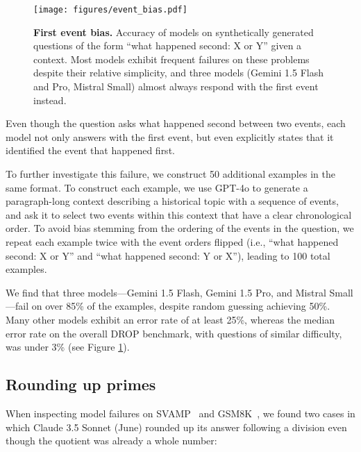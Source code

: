 \begin{figure}
    \centering
    \texttt{[image: figures/event\_bias.pdf]}
    \caption{\textbf{First event bias.} Accuracy of models on synthetically generated questions of the form  ``what happened second: X or Y'' given a context. Most models exhibit frequent failures on these problems despite their relative simplicity, and three models (Gemini 1.5 Flash and Pro, Mistral Small) almost always respond with the first event instead.}
    \label{appfig:event_bias}
\end{figure}

\noindent Even though the question asks what happened second between two events, each model not only answers with the first event, but even explicitly states that it identified the event that happened first.

To further investigate this failure, we construct 50 additional examples in the same format. To construct each example, we use GPT-4o to generate a paragraph-long context describing a historical topic with a sequence of events, and ask it to select two events within this context that have a clear chronological order. To avoid bias stemming from the ordering of the events in the question, we repeat each example twice with the event orders flipped (i.e., ``what happened second: X or Y'' and ``what happened second: Y or X''), leading to 100 total examples.

We find that three models---Gemini 1.5 Flash, Gemini 1.5 Pro, and Mistral Small---fail on over 85\% of the examples, despite random guessing achieving 50\%. Many other models exhibit an error rate of at least 25\%, whereas the median error rate on the overall DROP benchmark, with questions of similar difficulty, was under 3\% (see Figure \ref{appfig:event_bias}).

\subsection{Rounding up primes} \label{app:patterns-rounding}

When inspecting model failures on SVAMP~\citep{patel2021nlp} and GSM8K~\citep{cobbe2021training}, we found two cases in which Claude 3.5 Sonnet (June) rounded up its answer following a division even though the quotient was already a whole number:

